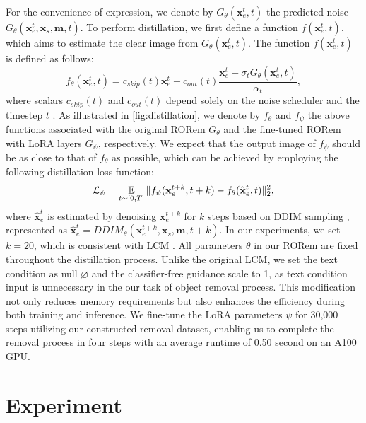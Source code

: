 \documentclass[10pt,twocolumn,letterpaper]{article}
\begin{document}
For the convenience of expression, we denote by $G_{\theta}(\mathbf{x}_e^t,t)$ the predicted noise $G_{\theta}(\mathbf{x}_e^t,\bar{\mathbf{x}}_s,\mathbf{m},t)$. To perform distillation, we first define a function $f(\mathbf{x}_e^t,t)$, which aims to estimate the clear image from $G_{\theta}(\mathbf{x}_e^t,t)$. The function $f(\mathbf{x}_e^t,t)$ is defined as follows:
\begin{equation}
    f_{\theta}(\mathbf{x}_e^t,t) = c_{skip}(t) \mathbf{x}_e^t + c_{out}(t) \frac{\mathbf{x}_e^t - \sigma_t G_{\theta}(\mathbf{x}_e^t,t) }{\alpha_t},
    \label{eq:mapping}
\end{equation}
where scalars $c_{skip}(t)$ and $c_{out}(t)$ depend solely on the noise scheduler and the timestep $t$ \cite{song2020denoising,ho2020denoising}. As illustrated in \cref{fig:distillation}, we denote by $f_{\theta}$ and $f_{\psi}$ the above functions associated with the original RORem $G_{\theta}$ and the fine-tuned RORem with LoRA layers $G_{\psi}$, respectively. We expect that the output image of $f_{\psi}$ should be as close to that of $f_{\theta}$ as possible, which can be achieved by employing the following distillation loss function:
\begin{equation}
    \mathcal{L}_{\psi} = \operatornamewithlimits{\mathbb{E}}\limits_{t\sim [0,T]} \| f_{\psi}(\mathbf{x}_e^{t+k},t+k) - f_{\theta}(\hat{\mathbf{x}}_e^t,t) \|_2^2,
    \label{eq:distillation}
\end{equation}
where $\hat{\mathbf{x}}_e^t$ is estimated by denoising $\mathbf{x}_e^{t+k}$ for $k$ steps based on DDIM sampling \cite{song2020denoising}, represented as $\hat{\mathbf{x}}_e^{t}=DDIM_{\theta}(\mathbf{x}_e^{t+k},\bar{\mathbf{x}}_s,\mathbf{m},t+k)$. In our experiments, we set $k=20$, which is consistent with LCM \cite{luo2023latent}. All parameters $\theta$ in our RORem are fixed throughout the distillation process. Unlike the original LCM, we set the text condition as null $\varnothing$ and the classifier-free guidance scale to 1, as text condition input is unnecessary in the our task of object removal process. This modification not only reduces memory requirements but also enhances the efficiency during both training and inference. We fine-tune the LoRA parameters $\psi$ for 30,000 steps utilizing our constructed removal dataset, enabling us to complete the removal process in four steps with an average runtime of 0.50 second on an A100 GPU.

\section{Experiment}
\end{document}
